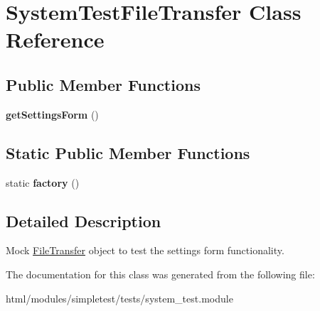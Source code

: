 \hypertarget{classSystemTestFileTransfer}{
\section{SystemTestFileTransfer Class Reference}
\label{classSystemTestFileTransfer}
}
\subsection*{Public Member Functions}
\begin{DoxyCompactItemize}
\item 
\hypertarget{classSystemTestFileTransfer_aa7455f15f36a45cc0863b0a43269d964}{
{\bfseries getSettingsForm} ()}
\label{classSystemTestFileTransfer_aa7455f15f36a45cc0863b0a43269d964}

\end{DoxyCompactItemize}
\subsection*{Static Public Member Functions}
\begin{DoxyCompactItemize}
\item 
\hypertarget{classSystemTestFileTransfer_a70f48981cd82b86b9258d12076fb8ecd}{
static {\bfseries factory} ()}
\label{classSystemTestFileTransfer_a70f48981cd82b86b9258d12076fb8ecd}

\end{DoxyCompactItemize}


\subsection{Detailed Description}
Mock \hyperlink{classFileTransfer}{FileTransfer} object to test the settings form functionality. 

The documentation for this class was generated from the following file:\begin{DoxyCompactItemize}
\item 
html/modules/simpletest/tests/system\_\-test.module\end{DoxyCompactItemize}

